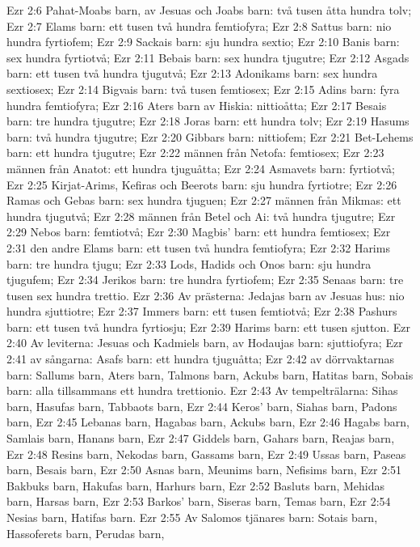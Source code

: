 Ezr 2:6  Pahat-Moabs barn, av Jesuas och Joabs barn: två tusen åtta hundra tolv;
Ezr 2:7  Elams barn: ett tusen två hundra femtiofyra;
Ezr 2:8  Sattus barn: nio hundra fyrtiofem;
Ezr 2:9  Sackais barn: sju hundra sextio;
Ezr 2:10  Banis barn: sex hundra fyrtiotvå;
Ezr 2:11  Bebais barn: sex hundra tjugutre;
Ezr 2:12  Asgads barn: ett tusen två hundra tjugutvå;
Ezr 2:13  Adonikams barn: sex hundra sextiosex;
Ezr 2:14  Bigvais barn: två tusen femtiosex;
Ezr 2:15  Adins barn: fyra hundra femtiofyra;
Ezr 2:16  Aters barn av Hiskia: nittioåtta;
Ezr 2:17  Besais barn: tre hundra tjugutre;
Ezr 2:18  Joras barn: ett hundra tolv;
Ezr 2:19  Hasums barn: två hundra tjugutre;
Ezr 2:20  Gibbars barn: nittiofem;
Ezr 2:21  Bet-Lehems barn: ett hundra tjugutre;
Ezr 2:22  männen från Netofa: femtiosex;
Ezr 2:23  männen från Anatot: ett hundra tjuguåtta;
Ezr 2:24  Asmavets barn: fyrtiotvå;
Ezr 2:25  Kirjat-Arims, Kefiras och Beerots barn: sju hundra fyrtiotre;
Ezr 2:26  Ramas och Gebas barn: sex hundra tjuguen;
Ezr 2:27  männen från Mikmas: ett hundra tjugutvå;
Ezr 2:28  männen från Betel och Ai: två hundra tjugutre;
Ezr 2:29  Nebos barn: femtiotvå;
Ezr 2:30  Magbis' barn: ett hundra femtiosex;
Ezr 2:31  den andre Elams barn: ett tusen två hundra femtiofyra;
Ezr 2:32  Harims barn: tre hundra tjugu;
Ezr 2:33  Lods, Hadids och Onos barn: sju hundra tjugufem;
Ezr 2:34  Jerikos barn: tre hundra fyrtiofem;
Ezr 2:35  Senaas barn: tre tusen sex hundra trettio.
Ezr 2:36  Av prästerna: Jedajas barn av Jesuas hus: nio hundra sjuttiotre;
Ezr 2:37  Immers barn: ett tusen femtiotvå;
Ezr 2:38  Pashurs barn: ett tusen två hundra fyrtiosju;
Ezr 2:39  Harims barn: ett tusen sjutton.
Ezr 2:40  Av leviterna: Jesuas och Kadmiels barn, av Hodaujas barn: sjuttiofyra;
Ezr 2:41  av sångarna: Asafs barn: ett hundra tjuguåtta;
Ezr 2:42  av dörrvaktarnas barn: Sallums barn, Aters barn, Talmons barn, Ackubs barn, Hatitas barn, Sobais barn: alla tillsammans ett hundra trettionio.
Ezr 2:43  Av tempelträlarna: Sihas barn, Hasufas barn, Tabbaots barn,
Ezr 2:44  Keros' barn, Siahas barn, Padons barn,
Ezr 2:45  Lebanas barn, Hagabas barn, Ackubs barn,
Ezr 2:46  Hagabs barn, Samlais barn, Hanans barn,
Ezr 2:47  Giddels barn, Gahars barn, Reajas barn,
Ezr 2:48  Resins barn, Nekodas barn, Gassams barn,
Ezr 2:49  Ussas barn, Paseas barn, Besais barn,
Ezr 2:50  Asnas barn, Meunims barn, Nefisims barn,
Ezr 2:51  Bakbuks barn, Hakufas barn, Harhurs barn,
Ezr 2:52  Basluts barn, Mehidas barn, Harsas barn,
Ezr 2:53  Barkos' barn, Siseras barn, Temas barn,
Ezr 2:54  Nesias barn, Hatifas barn.
Ezr 2:55  Av Salomos tjänares barn: Sotais barn, Hassoferets barn, Perudas barn,
